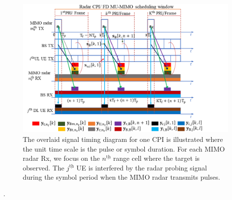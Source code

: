 \documentclass[9pt,journal]{IEEEtran}
\newcommand{\ith}[1]    {{#1}^{\underline{\text{th}}}}
\theoremstyle{definition}
\begin{document}
\begin{figure}[!t]
		\centering
		\includegraphics[width=1.0\columnwidth]{system_model_TSP.png}
		\caption{The overlaid signal timing diagram for one CPI is illustrated where the unit time scale is the pulse or symbol duration. For each MIMO radar Rx, we focus on the $\ith{n}$ range cell where the target is observed. The $\ith{j}$ UE is interfered by the radar probing signal during the symbol period when the MIMO radar transmits pulses.} 
		\vspace{-2em}
		\label{fig:systemmodel}
	\end{figure} . %
\end{document}
